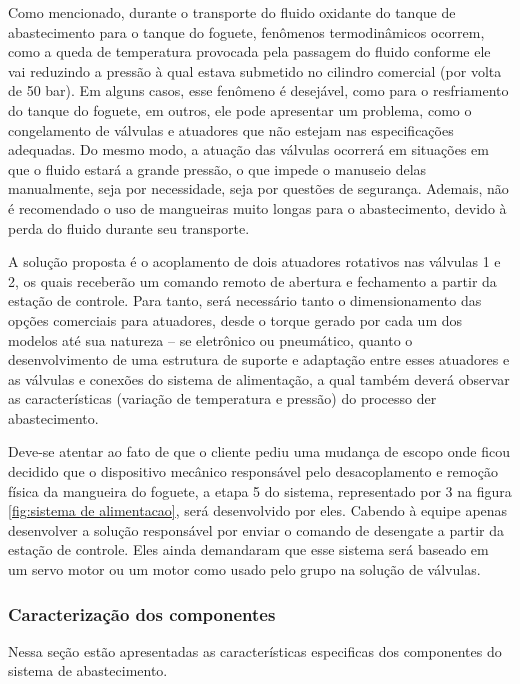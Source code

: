 \par Como mencionado, durante o transporte do fluido oxidante do tanque de abastecimento para o tanque do foguete, fenômenos termodinâmicos ocorrem, como a queda de temperatura provocada pela passagem do fluido conforme ele vai reduzindo a pressão à qual estava submetido no cilindro comercial (por volta de 50 bar). Em alguns casos, esse fenômeno é desejável, como para o resfriamento do tanque do foguete, em outros, ele pode apresentar um problema, como o congelamento de válvulas e atuadores que não estejam nas especificações adequadas. Do mesmo modo, a atuação das válvulas ocorrerá em situações em que o fluido estará a grande pressão, o que impede o manuseio delas manualmente, seja por necessidade, seja por questões de segurança. Ademais, não é recomendado o uso de mangueiras muito longas para o abastecimento, devido à perda do fluido durante seu transporte.

\par A solução proposta é o acoplamento de dois atuadores rotativos nas válvulas 1 e 2, os quais receberão um comando remoto de abertura e fechamento a partir da estação de controle. Para tanto, será necessário tanto o dimensionamento das opções comerciais para atuadores, desde o torque gerado por cada um dos modelos até sua natureza – se eletrônico ou pneumático, quanto o desenvolvimento de uma estrutura de suporte e adaptação entre esses atuadores e as válvulas e conexões do sistema de alimentação, a qual também deverá observar as características (variação de temperatura e pressão) do processo der abastecimento.

\par Deve-se atentar ao fato de que o cliente pediu uma mudança de escopo onde ficou decidido que o dispositivo mecânico responsável pelo desacoplamento e remoção física da mangueira do foguete, a etapa 5 do sistema, representado por 3 na figura \ref{fig:sistema de alimentacao},  será desenvolvido por eles. Cabendo à equipe apenas desenvolver a solução responsável por enviar o comando de desengate a partir da estação de controle. Eles ainda demandaram que esse sistema será baseado em um servo motor ou um motor como usado pelo grupo na solução de válvulas.

\subsubsection{Caracterização dos componentes}

\par Nessa seção estão apresentadas as características especificas dos componentes do sistema de abastecimento.

